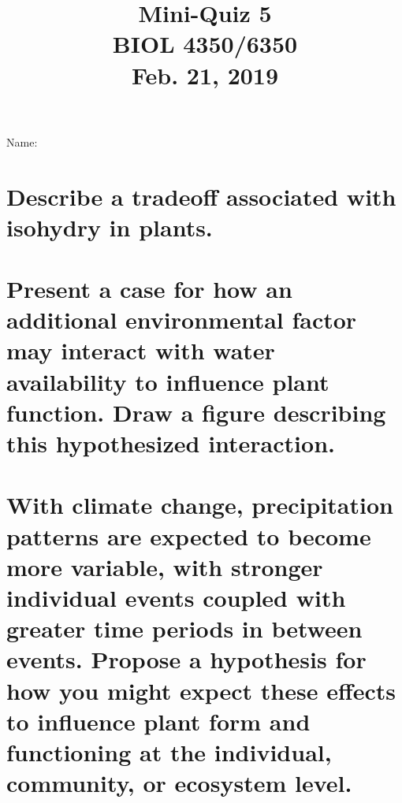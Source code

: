 \documentclass[12pt, notitlepage]{article}   	%
\title{
	\textbf{
		Mini-Quiz 5
	} \\
	\large BIOL 4350/6350 \\
	\large Feb. 21, 2019 \\
}
\date{\vspace{-5ex}}
\def\wl{\par \vspace{\baselineskip}}
\begin{document}
{\selectfont %

\large{Name:}

{\let\newpage\relax\maketitle}

\section{\small{Describe a tradeoff associated with isohydry in plants.}}
\wl
\wl
\wl
\wl
\wl
\wl
\wl
\wl
\wl
\wl

\section{\small{Present a case for how an additional environmental factor may interact 
with water availability to influence plant function. Draw a figure describing this 
hypothesized interaction.}}

\newpage

\section{\small{With climate change, precipitation patterns are expected to become
more variable, with stronger individual events coupled with greater time periods in
between events. Propose a hypothesis for how you might expect these effects to
influence plant form and functioning at the individual, community, or ecosystem
level.}}

} %
\end{document}

